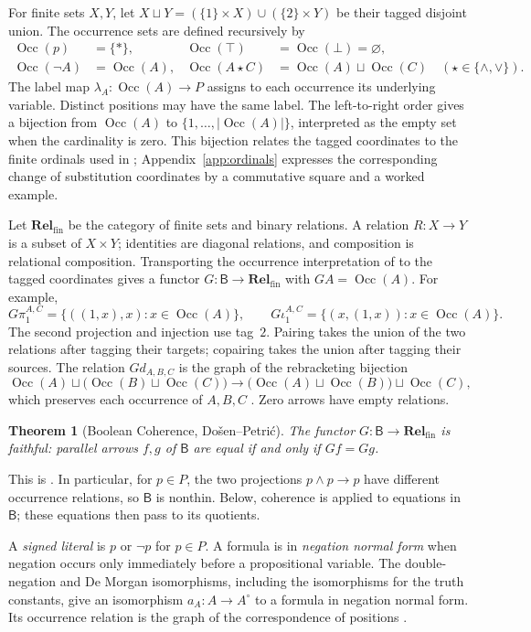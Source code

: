 \documentclass[11pt]{article}
\newtheorem{theorem}{Theorem}[section]
\newcommand{\B}{\mathsf B}
\newcommand{\Occ}{\operatorname{Occ}}
\newcommand{\Rel}{\mathbf{Rel}_{\mathrm{fin}}}
\begin{document}
For finite sets $X,Y$, let
$X\sqcup Y=(\{1\}\times X)\cup(\{2\}\times Y)$ be their tagged
disjoint union. The occurrence sets are defined recursively by
\[
 \begin{aligned}
 \Occ(p)&=\{*\},&
 \Occ(\top)&=\Occ(\bot)=\varnothing,\\
 \Occ(\neg A)&=\Occ(A),&
 \Occ(A\mathbin\star C)&=\Occ(A)\sqcup\Occ(C)
       \quad(\star\in\{\wedge,\vee\}).
 \end{aligned}
\]
The label map $\lambda_A:\Occ(A)\to P$ assigns to each occurrence
its underlying variable. Distinct positions may have the same label.
The left-to-right
order gives a bijection from $\Occ(A)$ to
$\{1,\ldots,|\Occ(A)|\}$, interpreted as the empty set when the
cardinality is zero. This bijection relates the tagged coordinates to
the finite ordinals used in \cite{DP}; Appendix~\ref{app:ordinals}
expresses the corresponding change of substitution coordinates by a
commutative square and a worked example.

Let $\Rel$ be the category of finite sets and binary relations.
A relation $R:X\to Y$ is a subset of $X\times Y$; identities are
diagonal relations, and composition is relational composition.
Transporting the occurrence interpretation of \cite{DP} to the
tagged coordinates gives a functor
$G:\B\to\Rel$ with $GA=\Occ(A)$.
For example,
\[
 G\pi_1^{A,C}=\{((1,x),x):x\in\Occ(A)\},\qquad
 G\iota_1^{A,C}=\{(x,(1,x)):x\in\Occ(A)\}.
\]
The second projection and injection use tag~$2$. Pairing takes the
union of the two relations after tagging their targets; copairing
takes the union after tagging their sources. The relation $Gd_{A,B,C}$
is the graph of the rebracketing bijection
\[
 \Occ(A)\sqcup\bigl(\Occ(B)\sqcup\Occ(C)\bigr)
 \longrightarrow
 \bigl(\Occ(A)\sqcup\Occ(B)\bigr)\sqcup\Occ(C),
\]
which preserves each occurrence of $A,B,C$
\cite[\S2.9, p.~60]{DP}. Zero arrows have empty relations.

\begin{theorem}[Boolean Coherence, Do\v{s}en--Petri\'c]
\label{thm:coherence}
The functor $G:\B\to\Rel$ is faithful: parallel arrows $f,g$ of
$\B$ are equal if and only if $Gf=Gg$.
\end{theorem}

This is \cite[\S14.2, p.~321]{DP}. In particular, for $p\in P$, the
two projections $p\wedge p\to p$ have different occurrence
relations, so $\B$ is nonthin. Below, coherence is applied to
equations in $\B$; these equations then pass to its quotients.

A \emph{signed literal} is $p$ or $\neg p$ for $p\in P$.
A formula is in \emph{negation normal form} when negation occurs only
immediately before a propositional variable. The double-negation and
De Morgan isomorphisms, including the isomorphisms for the truth
constants, give an isomorphism $a_A:A\to A^\circ$ to a formula in
negation normal form. Its occurrence relation is the graph of the
correspondence of positions \cite[\S14.1, pp.~313--315]{DP}.
\end{document}
